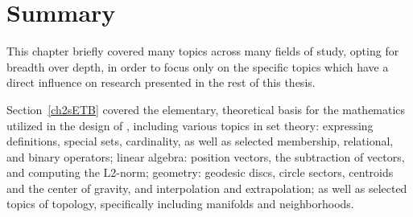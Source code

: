 %
%

%
%
%
%
%
%
\section{Summary}
This chapter briefly covered many topics across many fields of study, opting for breadth over depth, in order to focus only on the specific topics which have a direct influence on research presented in the rest of this thesis.

Section~\ref{ch2sETB} covered the elementary, theoretical basis for the mathematics utilized in the design of , including various topics in set theory: expressing definitions, special sets, cardinality, as well as selected membership, relational, and binary operators; linear algebra: position vectors, the subtraction of vectors, and computing the L2-norm; geometry: geodesic discs, circle sectors, centroids and the center of gravity, and interpolation and extrapolation; as well as selected topics of topology, specifically including manifolds and neighborhoods. 

